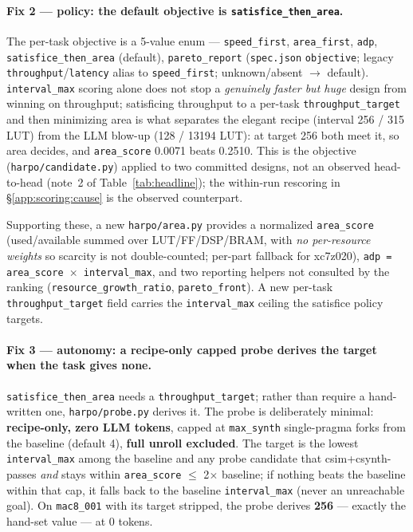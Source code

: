 \paragraph{Fix 2 --- policy: the default objective is \texttt{satisfice\_then\_area}.}
The per-task objective is a 5-value enum --- \texttt{speed\_first}, \texttt{area\_first},
\texttt{adp}, \texttt{satisfice\_then\_area} (default), \texttt{pareto\_report}
(\texttt{spec.json} \texttt{objective}; legacy \texttt{throughput}/\texttt{latency}
alias to \texttt{speed\_first}; unknown/absent $\rightarrow$ default).
\texttt{interval\_max} scoring alone does not stop a \emph{genuinely faster but huge}
design from winning on throughput; satisficing throughput to a per-task
\texttt{throughput\_target} and then minimizing area is what separates the elegant recipe
(interval 256 / 315 LUT) from the LLM blow-up (128 / 13194 LUT): at target 256 both meet
it, so area decides, and \texttt{area\_score} 0.0071 beats 0.2510. This is the objective
(\texttt{harpo/candidate.py}) applied to two committed designs, not an observed
head-to-head (note~2 of Table~\ref{tab:headline}); the within-run rescoring in
\S\ref{app:scoring:cause} is the observed counterpart.

Supporting these, a new \texttt{harpo/area.py} provides a normalized
\texttt{area\_score} (used/available summed over LUT/FF/DSP/BRAM, with \emph{no
per-resource weights} so scarcity is not double-counted; per-part fallback for
xc7z020), \texttt{adp = area\_score $\times$ interval\_max}, and two reporting
helpers not consulted by the ranking (\texttt{resource\_growth\_ratio},
\texttt{pareto\_front}). A new per-task
\texttt{throughput\_target} field carries the \texttt{interval\_max} ceiling the
satisfice policy targets.

\paragraph{Fix 3 --- autonomy: a recipe-only capped probe derives the target when the task gives none.}
\texttt{satisfice\_then\_area} needs a \texttt{throughput\_target}; rather than require
a hand-written one, \texttt{harpo/probe.py} derives it. The probe is deliberately
minimal: \textbf{recipe-only, zero LLM tokens}, capped at \texttt{max\_synth}
single-pragma forks from the baseline (default 4), \textbf{full unroll excluded}. The
target is the lowest \texttt{interval\_max} among the baseline and any probe candidate
that csim+csynth-passes \emph{and} stays within \texttt{area\_score} $\leq$ 2$\times$
baseline; if nothing beats the baseline within that cap, it falls back to the baseline
\texttt{interval\_max} (never an unreachable goal). On \texttt{mac8\_001} with its
target stripped, the probe derives \textbf{256} --- exactly the hand-set value --- at
0 tokens.

